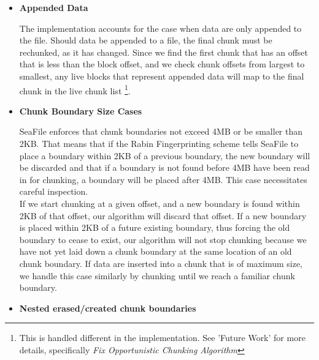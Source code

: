 \documentclass[table]{article}
\begin{document}
\begin{multicols}{2}
\begin{itemize}
    \item \textbf{Appended Data}
    
        The implementation accounts for the case when data are only appended to the file. Should data be appended to a file, the final chunk must be rechunked, as it has changed. Since we find the first chunk that has an offset that is less than the block offset, and we check chunk offsets from largest to smallest, any live blocks that represent appended data will map to the final chunk in the live chunk list \footnote{This is handled different in the implementation. See 'Future Work' for more details, specifically \textit{Fix Opportunistic Chunking Algorithm}}.

    \item \textbf{Chunk Boundary Size Cases}
    
        SeaFile enforces that chunk boundaries not exceed 4MB or be smaller than 2KB. That means that if the Rabin Fingerprinting scheme tells SeaFile to place a boundary within 2KB of a previous boundary, the new boundary will be discarded and that if a boundary is not found before 4MB have been read in for chunking, a boundary will be placed after 4MB. This case necessitates careful inspection.\\

        If we start chunking at a given offset, and a new boundary is found within 2KB of that offset, our algorithm will discard that offset. If a new boundary is placed within 2KB of a future existing boundary, thus forcing the old boundary to cease to exist, our algorithm will not stop chunking because we have not yet laid down a chunk boundary at the same location of an old chunk boundary. If data are inserted into a chunk that is of maximum size, we handle this case similarly by chunking until we reach a familiar chunk boundary.

    \item \textbf{Nested erased/created chunk boundaries}
    

\end{itemize}
\end{multicols}
\end{document}
